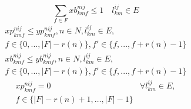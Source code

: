 \documentclass[a4j,twocolumn,fleqn]{jarticle}
\begin{document}
\begin{equation}%
\sum_{f \in F}xb^{nij}_{kmf} \leq 1 \quad l^{ij}_{km}\in E
\end{equation}
\begin{eqnarray}%
xp^{nij}_{kmf} \leq yp^{nij}_{kmf}, n \in N, l^{ij}_{km} \in E, \\
f \in \{0, ... , |F|-r(n)\},f' \in \{f, ... ,f + r(n)-1\}\nonumber
\end{eqnarray}%
\begin{eqnarray}%
xb^{nij}_{kmf} \leq yb^{nij}_{kmf}, n \in N, l^{ij}_{km} \in E, \\
f \in \{0, ... , |F|-r(n)\},f' \in \{f, ... ,f + r(n)-1\}\nonumber
\end{eqnarray}%
\begin{eqnarray}%
xp^{nij}_{kmf} = 0 & \forall l^{ij}_{km} \in E, \\
f \in \{|F| - r(n)+1, \dots ,|F|-1\}\nonumber
\end{eqnarray}%
\end{document}
